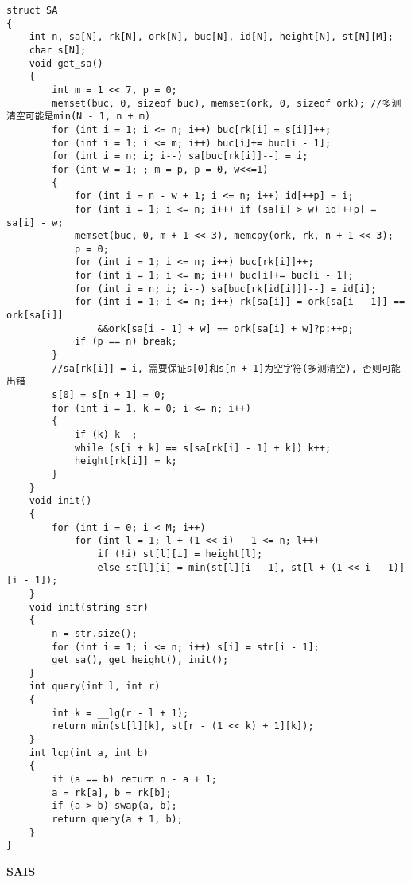 \documentclass[a4paper,fontset=none]{ctexart}
\begin{document}
\begin{verbatim}
struct SA
{
    int n, sa[N], rk[N], ork[N], buc[N], id[N], height[N], st[N][M];
    char s[N];
    void get_sa()
    {
        int m = 1 << 7, p = 0;
        memset(buc, 0, sizeof buc), memset(ork, 0, sizeof ork); //多测清空可能是min(N - 1, n + m)
        for (int i = 1; i <= n; i++) buc[rk[i] = s[i]]++;
        for (int i = 1; i <= m; i++) buc[i]+= buc[i - 1];
        for (int i = n; i; i--) sa[buc[rk[i]]--] = i;
        for (int w = 1; ; m = p, p = 0, w<<=1)
        {
            for (int i = n - w + 1; i <= n; i++) id[++p] = i;
            for (int i = 1; i <= n; i++) if (sa[i] > w) id[++p] = sa[i] - w;
            memset(buc, 0, m + 1 << 3), memcpy(ork, rk, n + 1 << 3);
            p = 0;
            for (int i = 1; i <= n; i++) buc[rk[i]]++;
            for (int i = 1; i <= m; i++) buc[i]+= buc[i - 1];
            for (int i = n; i; i--) sa[buc[rk[id[i]]]--] = id[i];
            for (int i = 1; i <= n; i++) rk[sa[i]] = ork[sa[i - 1]] == ork[sa[i]]
                &&ork[sa[i - 1] + w] == ork[sa[i] + w]?p:++p;
            if (p == n) break;
        }
        //sa[rk[i]] = i, 需要保证s[0]和s[n + 1]为空字符(多测清空), 否则可能出错
        s[0] = s[n + 1] = 0;
        for (int i = 1, k = 0; i <= n; i++)
        {
            if (k) k--;
            while (s[i + k] == s[sa[rk[i] - 1] + k]) k++;
            height[rk[i]] = k;
        }
    }
    void init()
    {
        for (int i = 0; i < M; i++)
            for (int l = 1; l + (1 << i) - 1 <= n; l++)
                if (!i) st[l][i] = height[l];
                else st[l][i] = min(st[l][i - 1], st[l + (1 << i - 1)][i - 1]);
    }
    void init(string str)
    {
        n = str.size();
        for (int i = 1; i <= n; i++) s[i] = str[i - 1];
        get_sa(), get_height(), init();
    }
    int query(int l, int r)
    {
        int k = __lg(r - l + 1);
        return min(st[l][k], st[r - (1 << k) + 1][k]);
    }
    int lcp(int a, int b)
    {
        if (a == b) return n - a + 1;
        a = rk[a], b = rk[b];
        if (a > b) swap(a, b);
        return query(a + 1, b);
    }
}
\end{verbatim}

\textbf{SAIS}
\end{document}
